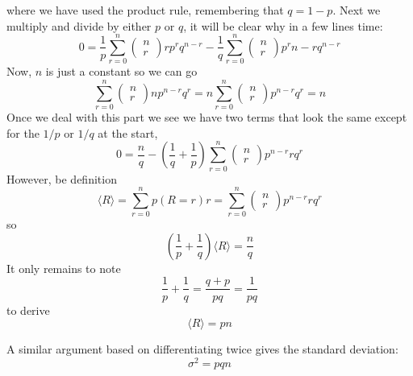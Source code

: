 \documentclass[11pt,a4paper]{scrartcl}
\begin{document}
where we have used the product rule, remembering that $q=1-p$. Next we multiply and divide by either $p$ or $q$, it will be clear why in a few lines time:
\begin{equation}
0=\frac{1}{p}\sum_{r=0}^n \left(\begin{array}{c}n\\r\end{array}\right)rp^rq^{n-r}
-\frac{1}{q}\sum_{r=0}^n \left(\begin{array}{c}n\\r\end{array}\right)p^r{n-r}q^{n-r}
\end{equation}
Now, $n$ is just a constant so we can go
\begin{equation}
\sum_{r=0}^n \left(\begin{array}{c}n\\r\end{array}\right)np^{n-r}q^r=n\sum_{r=0}^n \left(\begin{array}{c}n\\r\end{array}\right)p^{n-r}q^r=n
\end{equation}
Once we deal with this part we see we have two terms that look the same except for the $1/p$ or $1/q$ at the start, 
\begin{equation}
0=\frac{n}{q}-\left(\frac{1}{q}+\frac{1}{p}\right)\sum_{r=0}^n \left(\begin{array}{c}n\\r\end{array}\right)p^{n-r}rq^r
\end{equation}
However, be definition
\begin{equation}
\langle R\rangle=\sum_{r=0}^n p(R=r)r=\sum_{r=0}^n \left(\begin{array}{c}n\\r\end{array}\right)p^{n-r}rq^r
\end{equation}
so
\begin{equation}
\left(\frac{1}{p}+\frac{1}{q}\right)\langle R\rangle=\frac{n}{q}
\end{equation}
It only remains to note
\begin{equation}
\frac{1}{p}+\frac{1}{q}=\frac{q+p}{pq}=\frac{1}{pq}
\end{equation}
to derive
\begin{equation}
\langle R\rangle=pn
\end{equation}

A similar argument based on differentiating twice gives the standard
deviation:
\begin{equation}
\sigma^2=pqn
\end{equation}
\end{document}
